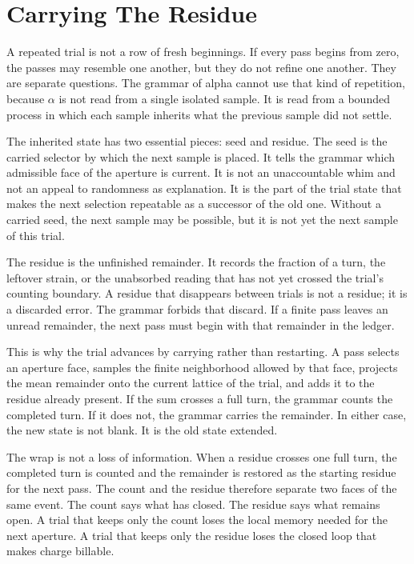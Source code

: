 \section{Carrying The Residue}

A repeated trial is not a row of fresh beginnings. If every pass begins from
zero, the passes may resemble one another, but they do not refine one another.
They are separate questions. The grammar of alpha cannot use that kind of
repetition, because \(\alpha\) is not read from a single isolated sample. It
is read from a bounded process in which each sample inherits what the previous
sample did not settle.

The inherited state has two essential pieces: seed and residue. The seed is
the carried selector by which the next sample is placed. It tells the grammar
which admissible face of the aperture is current. It is not an unaccountable
whim and not an appeal to randomness as explanation. It is the part of the
trial state that makes the next selection repeatable as a successor of the
old one. Without a carried seed, the next sample may be possible, but it is
not yet the next sample of this trial.

The residue is the unfinished remainder. It records the fraction of a turn,
the leftover strain, or the unabsorbed reading that has not yet crossed the
trial's counting boundary. A residue that disappears between trials is not a
residue; it is a discarded error. The grammar forbids that discard. If a
finite pass leaves an unread remainder, the next pass must begin with that
remainder in the ledger.

This is why the trial advances by carrying rather than restarting. A pass
selects an aperture face, samples the finite neighborhood allowed by that
face, projects the mean remainder onto the current lattice of the trial, and
adds it to the residue already present. If the sum crosses a full turn, the
grammar counts the completed turn. If it does not, the grammar carries the
remainder. In either case, the new state is not blank. It is the old state
extended.

The wrap is not a loss of information. When a residue crosses one full turn,
the completed turn is counted and the remainder is restored as the starting
residue for the next pass. The count and the residue therefore separate two
faces of the same event. The count says what has closed. The residue says
what remains open. A trial that keeps only the count loses the local memory
needed for the next aperture. A trial that keeps only the residue loses the
closed loop that makes charge billable.

